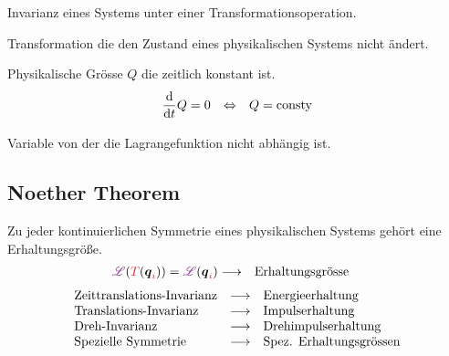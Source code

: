 \begin{defnbox}
  \begin{defn}[Symmetrie]
    Invarianz eines Systems unter einer Transformationsoperation.\\
  \end{defn}
\end{defnbox}
\begin{defnbox}
  \begin{defn}[Symmetrietransformation]
    Transformation die den Zustand
    eines physikalischen Systems nicht ändert.
  \end{defn}
\end{defnbox}
\begin{defnbox}\nospacing
  \begin{defn}[Erhaltungsgrösse]
    Physikalische Grösse $Q$ die zeitlich konstant ist.
    \begin{align*}
      &\frac{\diff}{\diff t}Q=0 &\Leftrightarrow&& Q=\text{consty}
    \end{align*}
  \end{defn}
\end{defnbox}
\begin{defnbox}\nospacing
  \begin{defn}
    Variable von der die Lagrangefunktion nicht abhängig ist.
  \end{defn}
\end{defnbox}
\subsection{Noether Theorem}
\label{subsec:Noether_Theorem}
\begin{theorembox}\nospacing
   \begin{theorem}\label{theorem:Noether}
    Zu jeder kontinuierlichen Symmetrie eines physikalischen Systems gehört eine Erhaltungsgröße. 
    \begin{align}
      \LT(\rd{T}(\vec{q}_{\idxi}))=\LT(\vec{q}_{\idxi})&\longrightarrow&&\text{Erhaltungsgrösse}
    \end{align}
    \begin{align*}
      &\text{Zeittranslations-Invarianz}&\longrightarrow&&&\text{Energieerhaltung}\nalign
      &\text{Translations-Invarianz}&\longrightarrow&&&\text{Impulserhaltung}\nalign
      &\text{Dreh-Invarianz}&\longrightarrow&&&\text{Drehimpulserhaltung}\nalign
      &\text{Spezielle Symmetrie}&\longrightarrow&&&\text{Spez. Erhaltungsgrössen}
    \end{align*}
   \end{theorem} 
\end{theorembox}
